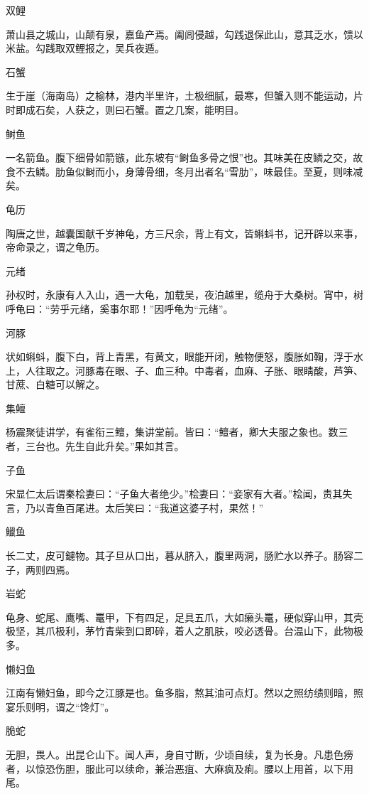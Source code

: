 \documentclass[a4paper,12pt,UTF8,twoside]{ctexbook}
\begin{document}
    双鲤
    
    萧山县之城山，山颠有泉，嘉鱼产焉。阖闾侵越，勾践退保此山，意其乏水，馈以米盐。勾践取双鲤报之，吴兵夜遁。
    
    石蟹
    
    生于崖（海南岛）之榆林，港内半里许，土极细腻，最寒，但蟹入则不能运动，片时即成石矣，人获之，则曰石蟹。置之几案，能明目。
    
    鲥鱼
    
    一名箭鱼。腹下细骨如箭镞，此东坡有“鲥鱼多骨之恨”也。其味美在皮鳞之交，故食不去鳞。肋鱼似鲥而小，身薄骨细，冬月出者名“雪肋”，味最佳。至夏，则味减矣。
    
    龟历
    
    陶唐之世，越囊国献千岁神龟，方三尺余，背上有文，皆蝌蚪书，记开辟以来事，帝命录之，谓之龟历。
    
    元绪
    
    孙权时，永康有人入山，遇一大龟，加载吴，夜泊越里，缆舟于大桑树。宵中，树呼龟曰：“劳乎元绪，奚事尔耶！”因呼龟为“元绪”。
    
    河豚
    
    状如蝌蚪，腹下白，背上青黑，有黄文，眼能开闭，触物便怒，腹胀如鞠，浮于水上，人往取之。河豚毒在眼、子、血三种。中毒者，血麻、子胀、眼睛酸，芦笋、甘蔗、白糖可以解之。
    
    集鳣
    
    杨震聚徒讲学，有雀衔三鳣，集讲堂前。皆曰：“鳣者，卿大夫服之象也。数三者，三台也。先生自此升矣。”果如其言。
    
    子鱼
    
    宋显仁太后谓秦桧妻曰：“子鱼大者绝少。”桧妻曰：“妾家有大者。”桧闻，责其失言，乃以青鱼百尾进。太后笑曰：“我道这婆子村，果然！”
    
    鱲鱼
    
    长二丈，皮可鑢物。其子旦从口出，暮从脐入，腹里两洞，肠贮水以养子。肠容二子，两则四焉。
    
    岩蛇
    
    龟身、蛇尾、鹰嘴、鼍甲，下有四足，足具五爪，大如癞头鼍，硬似穿山甲，其壳极坚，其爪极利，茅竹青柴到口即碎，着人之肌肤，咬必透骨。台温山下，此物极多。
    
    懒妇鱼
    
    江南有懒妇鱼，即今之江豚是也。鱼多脂，熬其油可点灯。然以之照纺绩则暗，照宴乐则明，谓之“馋灯”。
    
    脆蛇
    
    无胆，畏人。出昆仑山下。闻人声，身自寸断，少顷自续，复为长身。凡患色痨者，以惊恐伤胆，服此可以续命，兼治恶疽、大麻疯及痢。腰以上用首，以下用尾。
    
\end{document}
